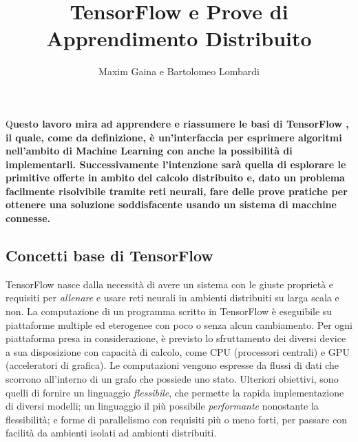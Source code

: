 \documentclass[DIV=calc, paper=a4, fontsize=11pt]{scrartcl}	 %
\title{TensorFlow e Prove di Apprendimento Distribuito} %
\author{Maxim Gaina e Bartolomeo Lombardi} %
\date{} %
\newcommand{\initial}[1]{ %
\lettrine[lines=3,lhang=0.3,nindent=0em]{
\color{DarkGoldenrod}
{\textsf{#1}}}{}}
\begin{document}
	\maketitle
	\thispagestyle{fancy}
	\initial{Q}\textbf{uesto lavoro mira ad apprendere e riassumere le basi di TensorFlow \cite{tf}, il quale, come da definizione, è un'interfaccia per esprimere algoritmi nell'ambito di Machine Learning con anche la possibilità di implementarli. Successivamente l'intenzione sarà quella di esplorare le primitive offerte in ambito del calcolo distribuito e, dato un problema facilmente risolvibile tramite reti neurali, fare delle prove pratiche per ottenere una soluzione soddisfacente usando un sistema di macchine connesse.}
	
	\begin{multicols}{2}
		\tableofcontents
		\section{Concetti base di TensorFlow}
			TensorFlow nasce dalla necessità di avere un sistema con le giuste proprietà e requisiti per \textit{allenare} e usare reti neurali in ambienti distribuiti su larga scala e non. La computazione di un programma scritto in TensorFlow è eseguibile su piattaforme multiple ed eterogenee con poco o senza alcun cambiamento. Per ogni piattaforma presa in considerazione, è previsto lo sfruttamento dei diversi device a sua disposizione con capacità di calcolo, come CPU (processori centrali) e GPU (acceleratori di grafica). Le computazioni vengono espresse da flussi di dati che scorrono all'interno di un grafo che possiede uno stato. Ulteriori obiettivi, sono quelli di fornire un linguaggio \textit{flessibile}, che permette la rapida implementazione di diversi modelli; un linguaggio il più possibile \textit{performante} nonostante la flessibilità; e forme di parallelismo con requisiti più o meno forti, per passare con facilità da ambienti isolati ad ambienti distribuiti.		

\end{multicols}
\end{document}
